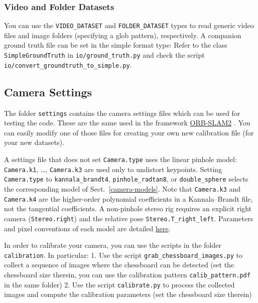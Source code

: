 \documentclass{article}
\begin{document}
\hypertarget{video-and-folder-datasets}{%
\subsubsection{Video and Folder Datasets}\label{video-and-folder-datasets}}

You can use the \texttt{VIDEO\_DATASET} and \texttt{FOLDER\_DATASET}
types to read generic video files and image folders (specifying a glob
pattern), respectively. A companion ground truth file can be set in the
simple format type: Refer to the class \texttt{SimpleGroundTruth} in
\texttt{io/ground\_truth.py} and check the script
\texttt{io/convert\_groundtruth\_to\_simple.py}.
\hypertarget{camera-settings}{%
\subsection{Camera Settings}\label{camera-settings}}

The folder \texttt{settings} contains the camera settings files which
can be used for testing the code. These are the same used in the
framework \href{https://github.com/raulmur/ORB_SLAM2}{ORB-SLAM2} \cite{ORB_SLAM2}. You
can easily modify one of those files for creating your own new
calibration file (for your new datasets).

A settings file that does not set \texttt{Camera.type} uses the linear pinhole model: \texttt{Camera.k1}, \ldots, \texttt{Camera.k3} are used only to undistort keypoints. Setting \texttt{Camera.type} to \texttt{kannala\_brandt4}, \texttt{pinhole\_radtan8}, or \texttt{double\_sphere} selects the corresponding model of Sect.~\ref{camera-models}. Note that \texttt{Camera.k3} and \texttt{Camera.k4} are the higher-order polynomial coefficients in a Kannala--Brandt file, not the tangential coefficients. A non-pinhole stereo rig requires an explicit right camera (\texttt{Stereo.right}) and the relative pose \texttt{Stereo.T\_right\_left}. Parameters and pixel conventions of each model are detailed \href{https://github.com/luigifreda/pyslam/blob/master/cpp/modules/camera_models/README.md}{here}.

In order to calibrate your camera, you can use the scripts in the folder
\texttt{calibration}. In particular: 1. Use the script
\texttt{grab\_chessboard\_images.py} to collect a sequence of images
where the chessboard can be detected (set the chessboard size therein,
you can use the calibration pattern \texttt{calib\_pattern.pdf} in the
same folder) 2. Use the script \texttt{calibrate.py} to process the
collected images and compute the calibration parameters (set the
chessboard size therein)
\end{document}
